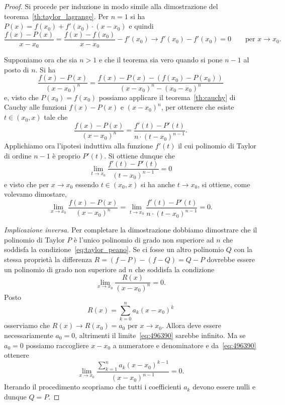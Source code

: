 \begin{proof}
\mymark{**}%
%
Si procede per induzione in modo simile alla dimostrazione 
del teorema~\ref{th:taylor_lagrange}.
%
Per $n=1$ si ha $P(x)=f(x_0) + f'(x_0)\cdot (x-x_0)$ e quindi 
\[
 \frac{f(x)-P(x)}{x-x_0} = \frac{f(x) - f(x_0)}{x-x_0} - f'(x_0) 
 \to f'(x_0) - f'(x_0) = 0  \qquad\text{per $x\to x_0$.}
\]

Supponiamo ora che sia $n>1$ e che il teorema sia vero
quando si pone $n-1$ al posto di $n$. Si ha 
\[
  \frac{f(x)-P(x)}{(x-x_0)^n} 
  = \frac{f(x)-P(x)-(f(x_0)-P(x_0))}{(x-x_0)^n - (x_0-x_0)^n}
\]
e, visto che $P(x_0) = f(x_0)$ possiamo applicare il teorema~\ref{th:cauchy} di Cauchy
alle funzioni $f(x)-P(x)$ e $(x-x_0)^n$,
per ottenere che esiste $t\in (x_0,x)$ tale che
\[
  \frac{f(x)-P(x)}{(x-x_0)^n} = \frac{f'(t)-P'(t)}{n\cdot (t-x_0)^{n-1}}.
\]
Applichiamo ora l'ipotesi induttiva alla funzione $f'(t)$ il cui 
polinomio di Taylor di ordine $n-1$ è proprio $P'(t)$. Si ottiene dunque 
che 
\[
 \lim_{t\to x_0} \frac{f'(t)-P'(t)}{(t-x_0)^{n-1}} = 0 
\]
e visto che per $x\to x_0$ essendo $t\in(x_0,x)$ si ha anche 
$t\to x_0$, si ottiene, come volevamo dimostare,
\[
 \lim_{x\to x_0} \frac{f(x)-P(x)}{(x-x_0)^n} 
 = \lim_{t\to x_0} \frac{f'(t)-P'(t)}{n\cdot (t-x_0)^{n-1}} = 0. 
\]

\emph{Implicazione inversa.}
Per completare la dimostrazione dobbiamo dimostrare che il polinomio di 
Taylor $P$ è l'unico polinomio di grado non superiore ad $n$ che soddisfa 
la condizione~\eqref{eq:taylor_peano}.
Se ci fosse un altro polinomio $Q$ con la stessa proprietà la differenza 
$R=(f-P)-(f-Q)=Q-P$ dovrebbe essere un polinomio di grado 
non superiore ad $n$ che soddisfa la condizione 
\begin{equation}\label{eq:496390}
  \lim_{x\to x_0}\frac{R(x)}{(x-x_0)^n}=0.  
\end{equation}
Posto 
\[
  R(x) = \sum_{k=0}^n a_k (x-x_0)^k  
\]
osserviamo che $R(x)\to R(x_0) = a_0$ per $x\to x_0$. 
Allora deve essere necessariamente $a_0 = 0$, 
altrimenti il limite~\eqref{eq:496390} sarebbe infinito.
Ma se $a_0=0$ possiamo raccogliere $x-x_0$ a numeratore 
e denominatore e da~\eqref{eq:496390} ottenere 
\[
  \lim_{x\to x_0}\frac{\displaystyle \sum_{k=1}^n a_k (x-x_0)^{k-1}}{(x-x_0)^{n-1}}=0.  
\]
Iterando il procedimento scopriamo che tutti i coefficienti $a_k$ 
devono essere nulli e dunque $Q=P$.
\end{proof}

